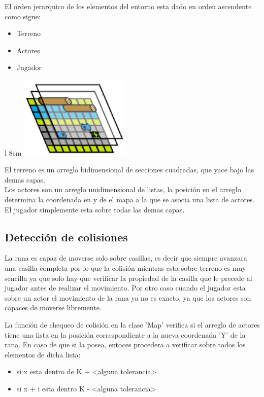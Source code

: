 \documentclass[letter, 12pt] {article}
\begin{document}
El orden jerarquico de los elementos del entorno esta dado 
en orden ascendente como sigue:

\begin {itemize}
  \item Terreno
  \item Actores
  \item Jugador
\end {itemize}

\begin {wrapfigure} {l} {8cm}
  \includegraphics[width=200px]{./img/layer-model.pdf}\\[.5cm]
\end {wrapfigure}

El terreno es un arreglo bidimensional de secciones cuadradas, que
yace bajo las demas capas.\\

Los actores son un arreglo unidimensional de listas, la posición
en el arreglo determina la coordenada en y de el mapa a la que se 
asocia una lista de actores.\\

El jugador simplemente esta sobre todas las demas capas.\\

\subsection* {Detección de colisiones}
La rana es capaz de moverse solo sobre casillas, es decir que siempre
avanzara una casilla completa por lo que la colisión mientras esta 
sobre terreno es muy sencilla ya que solo hay que verificar la 
propiedad de la casilla que le precede al jugador antes de realizar
el movimiento. Por otro caso cuando el jugador esta sobre un actor
el movimiento de la rana ya no es exacto, ya que los actores son
capaces de moverse libremente.\\

\newpage

La función de chequeo de colisión en la clase 'Map' verifica si
el arreglo de actores tiene una lista en la posición correspondiente 
a la nueva coordenada 'Y' de la rana. En caso de que si la posea, 
entoces procedera a verificar sobre todos los elementos de dicha lista:
\begin {itemize}
  \item si x esta dentro de K + <alguna tolerancia>\\ 
  \item si x + i esta dentro K - <alguna tolerancia>\\
\end {itemize}
\end{document}
